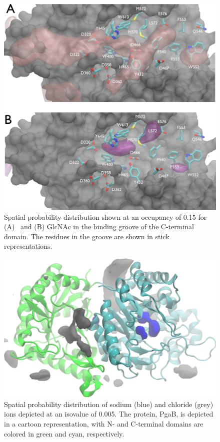 \begin{figure}[htbp]
\centering
\includegraphics[width=6.25in]{figures/results4/cterm_groove_surf2.pdf}
\caption[Spatial probability densities of GlcNAc and GlcNH3+ in the C-terminal groove]{Spatial probability distribution shown at an occupancy of 0.15 for (A) \glucosamine\ and (B) GlcNAc in the binding groove of the C-terminal domain.  The residues in the groove are shown in stick representations.}
\label{fig:groove}
\end{figure}

\begin{figure}[htbp]
\centering
\includegraphics[width=6.25in]{figures/results4/pgab_glucosamine_salt_densities.pdf}
\caption[Ionic distribution]{Spatial probability distribution of sodium (blue) and chloride (grey) ions depicted at an isovalue of 0.005. The protein, PgaB, is depicted in a cartoon representation, with N- and C-terminal domains are colored in green and cyan, respectively.}
\label{fig:salt_density_distribution}
\end{figure}


